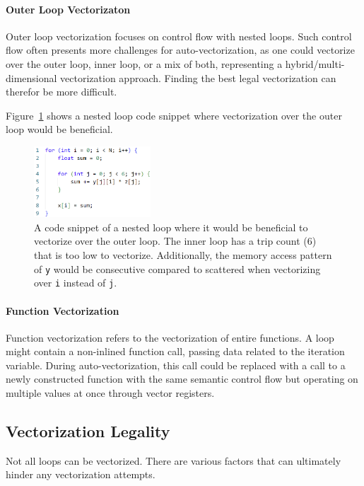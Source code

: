 \documentclass[sigplan,11pt,nonacm]{acmart}
\begin{document}
\paragraph{Outer Loop Vectorizaton}
Outer loop vectorization focuses on control flow with nested loops. Such control flow often presents
more challenges for auto-vectorization, as one could vectorize over the outer loop,
inner loop, or a mix of both, representing a hybrid/multi-dimensional vectorization approach.
Finding the best legal vectorization can therefor be more difficult.

Figure~\ref{fig:outer-loop-vec} shows a nested loop code snippet where vectorization over the
outer loop would be beneficial.

\begin{figure}
  \centering
  \includegraphics[width=0.39\textwidth]{images/outer-loop-vec.png}
  \caption{A code snippet of a nested loop where it would be beneficial to vectorize over the 
  outer loop. The inner loop has a trip count (6) that is too low to vectorize. Additionally,
  the memory access pattern of \texttt{y} would be consecutive compared to scattered when
  vectorizing over \texttt{i} instead of \texttt{j}.}
  \label{fig:outer-loop-vec}
\end{figure}

\paragraph{Function Vectorization}
Function vectorization refers to the vectorization of entire functions. A loop might contain a
non-inlined function call, passing data related to the iteration variable. During auto-vectorization, 
this call could be replaced with a call to a newly constructed function with the same semantic 
control flow but operating on multiple values at once through vector registers.
 
\subsection{Vectorization Legality}
\label{sec:vec-legal}
Not all loops can be vectorized. There are various factors that can ultimately hinder any
vectorization attempts.
\end{document}
